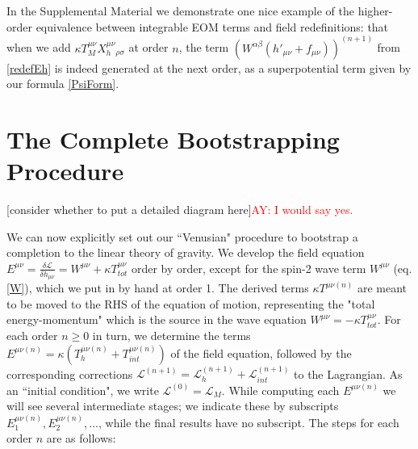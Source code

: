 \documentclass[aps,physrev,preprint,groupedaddress]{revtex4-2}
\newcommand{\AY}[1]{\textcolor{red}{AY: #1}}
\begin{document}
In the Supplemental Material we demonstrate one nice example of the higher-order equivalence between integrable EOM terms and field redefinitions: that when we add \(\kappa T^{\mu\nu}_MX_h^{\mu\nu}{}_{\rho\sigma}\) at order \(n\), the term
\(\left(W^{\alpha\beta}(h'_{\mu\nu}+f_{\mu\nu})\right)^{(n+1)}\) from \eqref{redefEh} is indeed generated at the next order, as a superpotential term given by our formula \eqref{PsiForm}.
\section{The Complete Bootstrapping Procedure}

[consider whether to put a detailed diagram here]\AY{I would say yes.}

We can now explicitly set out our ``Venusian" procedure to bootstrap a completion to the linear theory of gravity. We develop the field equation \(E^{\mu\nu}=\frac{\delta\mathcal{L}}{\delta h_{\mu\nu}}=W^{\mu\nu}+\kappa T_{tot}^{\mu\nu}\) order by order, except for the spin-2 wave term \(W^{\mu\nu}\) (eq. \eqref{W}), which we put in by hand at order 1. The derived terms \(\kappa T^{\mu\nu(n)}\) are meant to be moved to the RHS of the equation of motion, representing the "total energy-momentum" which is the source in the wave equation \(W^{\mu\nu}=-\kappa T_{tot}^{\mu\nu}\). For each order \(n\ge 0\) in turn, we determine the terms \(E^{\mu\nu(n)}=\kappa (T_h^{\mu\nu(n)}+T_{int}^{\mu\nu(n)})\) of the field equation, followed by the corresponding corrections \(\mathcal{L}^{(n+1)}=\mathcal{L}_h^{(n+1)}+\mathcal{L}_{int}^{(n+1)}\) to the Lagrangian. As an ``initial condition", we write  \(\mathcal{L}^{(0)}=\mathcal{L}_{M}\). While computing each \(E^{\mu\nu(n)}\) we will see several intermediate stages; we indicate these by subscripts \(E_1^{\mu\nu(n)},E_2^{\mu\nu(n)},...\), while the final results have no subscript. The steps for each order \(n\) are as follows:
\end{document}
